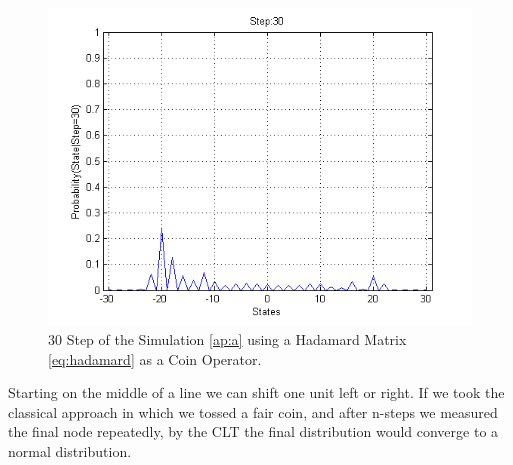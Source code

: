 \begin{figure}[h]
\centering 
\includegraphics[scale=0.50]{Figures/quantum_walk_line_hadamard.png}
\caption{30 Step of the Simulation \ref{ap:a} using a Hadamard Matrix \ref{eq:hadamard} as a Coin Operator.}
\label{fig:qwl_hadamard}
\end{figure}

Starting on the middle of a line we can shift one unit left or right.
If we took the classical approach in which we tossed a fair coin, and after n-steps we measured the final node repeatedly, by the \ac{CLT} the final distribution would converge to a normal distribution.
